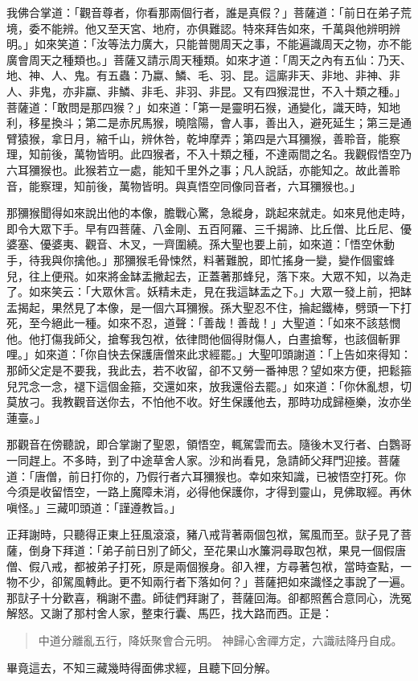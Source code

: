 我佛合掌道：「觀音尊者，你看那兩個行者，誰是真假？」菩薩道：「前日在弟子荒境，委不能辨。他又至天宮、地府，亦俱難認。特來拜告如來，千萬與他辨明辨明。」如來笑道：「汝等法力廣大，只能普閱周天之事，不能遍識周天之物，亦不能廣會周天之種類也。」菩薩又請示周天種類。如來才道：「周天之內有五仙：乃天、地、神、人、鬼。有五蟲：乃蠃、鱗、毛、羽、昆。這廝非天、非地、非神、非人、非鬼，亦非蠃、非鱗、非毛、非羽、非昆。又有四猴混世，不入十類之種。」菩薩道：「敢問是那四猴？」如來道：「第一是靈明石猴，通變化，識天時，知地利，移星換斗；第二是赤尻馬猴，曉陰陽，會人事，善出入，避死延生；第三是通臂猿猴，拿日月，縮千山，辨休咎，乾坤摩弄；第四是六耳獼猴，善聆音，能察理，知前後，萬物皆明。此四猴者，不入十類之種，不達兩間之名。我觀假悟空乃六耳獼猴也。此猴若立一處，能知千里外之事；凡人說話，亦能知之。故此善聆音，能察理，知前後，萬物皆明。與真悟空同像同音者，六耳獼猴也。」

那獼猴聞得如來說出他的本像，膽戰心驚，急縱身，跳起來就走。如來見他走時，即令大眾下手。早有四菩薩、八金剛、五百阿羅、三千揭諦、比丘僧、比丘尼、優婆塞、優婆夷、觀音、木叉，一齊圍繞。孫大聖也要上前，如來道：「悟空休動手，待我與你擒他。」那獼猴毛骨悚然，料著難脫，即忙搖身一變，變作個蜜蜂兒，往上便飛。如來將金缽盂撇起去，正蓋著那蜂兒，落下來。大眾不知，以為走了。如來笑云：「大眾休言。妖精未走，見在我這缽盂之下。」大眾一發上前，把缽盂揭起，果然見了本像，是一個六耳獼猴。孫大聖忍不住，掄起鐵棒，劈頭一下打死，至今絕此一種。如來不忍，道聲：「善哉！善哉！」大聖道：「如來不該慈憫他。他打傷我師父，搶奪我包袱，依律問他個得財傷人，白晝搶奪，也該個斬罪哩。」如來道：「你自快去保護唐僧來此求經罷。」大聖叩頭謝道：「上告如來得知：那師父定是不要我，我此去，若不收留，卻不又勞一番神思？望如來方便，把鬆箍兒咒念一念，褪下這個金箍，交還如來，放我還俗去罷。」如來道：「你休亂想，切莫放刁。我教觀音送你去，不怕他不收。好生保護他去，那時功成歸極樂，汝亦坐蓮臺。」

那觀音在傍聽說，即合掌謝了聖恩，領悟空，輒駕雲而去。隨後木叉行者、白鸚哥一同趕上。不多時，到了中途草舍人家。沙和尚看見，急請師父拜門迎接。菩薩道：「唐僧，前日打你的，乃假行者六耳獼猴也。幸如來知識，已被悟空打死。你今須是收留悟空，一路上魔障未消，必得他保護你，才得到靈山，見佛取經。再休嗔怪。」三藏叩頭道：「謹遵教旨。」

正拜謝時，只聽得正東上狂風滾滾，豬八戒背著兩個包袱，駕風而至。獃子見了菩薩，倒身下拜道：「弟子前日別了師父，至花果山水簾洞尋取包袱，果見一個假唐僧、假八戒，都被弟子打死，原是兩個猴身。卻入裡，方尋著包袱，當時查點，一物不少，卻駕風轉此。更不知兩行者下落如何？」菩薩把如來識怪之事說了一遍。那獃子十分歡喜，稱謝不盡。師徒們拜謝了，菩薩回海。卻都照舊合意同心，洗冤解怒。又謝了那村舍人家，整束行囊、馬匹，找大路而西。正是：
\begin{quote}
中道分離亂五行，降妖聚會合元明。
神歸心舍禪方定，六識祛降丹自成。
\end{quote}

畢竟這去，不知三藏幾時得面佛求經，且聽下回分解。
